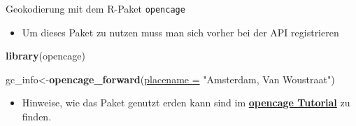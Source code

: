 \documentclass[ignorenonframetext,]{beamer}
\newenvironment{Shaded}{\begin{snugshade}}{\end{snugshade}}
\newcommand{\DataTypeTok}[1]{\textcolor[rgb]{0.74,0.68,0.62}{\underline{#1}}}
\newcommand{\KeywordTok}[1]{\textcolor[rgb]{0.26,0.66,0.93}{\textbf{#1}}}
\newcommand{\NormalTok}[1]{\textcolor[rgb]{0.74,0.68,0.62}{#1}}
\newcommand{\StringTok}[1]{\textcolor[rgb]{0.02,0.61,0.04}{#1}}
\providecommand{\tightlist}{%
  \setlength{\itemsep}{0pt}\setlength{\parskip}{0pt}}
\begin{document}
\begin{frame}[fragile]{Geokodierung mit dem R-Paket \texttt{opencage}}
\protect\hypertarget{geokodierung-mit-dem-r-paket-opencage}{}

\begin{itemize}
\tightlist
\item
  Um dieses Paket zu nutzen muss man sich vorher bei der API
  registrieren
\end{itemize}

\begin{Shaded}
\begin{Highlighting}[]
\KeywordTok{library}\NormalTok{(opencage)}
\end{Highlighting}
\end{Shaded}

\begin{Shaded}
\begin{Highlighting}[]
\NormalTok{gc_info<-}\KeywordTok{opencage_forward}\NormalTok{(}\DataTypeTok{placename =} 
                              \StringTok{"Amsterdam, Van Woustraat"}\NormalTok{)}
\end{Highlighting}
\end{Shaded}

\begin{itemize}
\tightlist
\item
  Hinweise, wie das Paket genutzt erden kann sind im
  \href{https://ropensci.org/tutorials/opencage_tutorial/}{\textbf{opencage
  Tutorial}} zu finden.
\end{itemize}

\end{frame}
\end{document}
